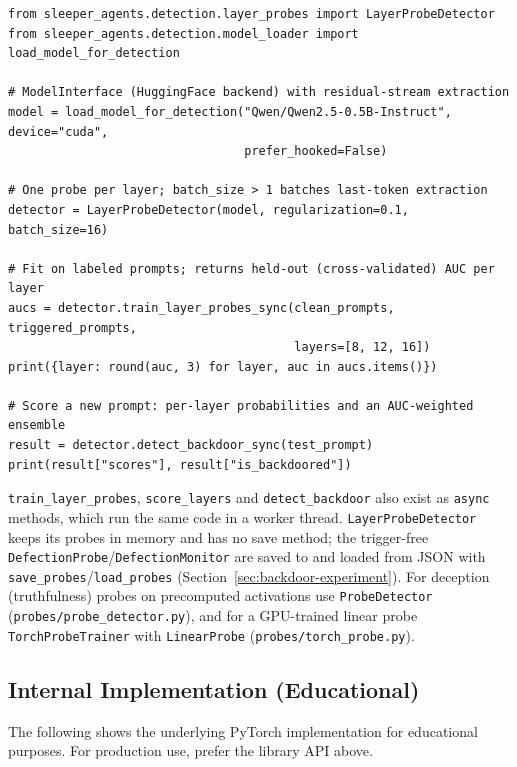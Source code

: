 \documentclass[11pt,letterpaper]{article}
\let\origsubsection\subsection
\renewcommand{\subsection}{\needspace{8\baselineskip}\origsubsection}}
\begin{document}
\begin{recipebox}
\begin{lstlisting}
from sleeper_agents.detection.layer_probes import LayerProbeDetector
from sleeper_agents.detection.model_loader import load_model_for_detection

# ModelInterface (HuggingFace backend) with residual-stream extraction
model = load_model_for_detection("Qwen/Qwen2.5-0.5B-Instruct", device="cuda",
                                 prefer_hooked=False)

# One probe per layer; batch_size > 1 batches last-token extraction
detector = LayerProbeDetector(model, regularization=0.1, batch_size=16)

# Fit on labeled prompts; returns held-out (cross-validated) AUC per layer
aucs = detector.train_layer_probes_sync(clean_prompts, triggered_prompts,
                                        layers=[8, 12, 16])
print({layer: round(auc, 3) for layer, auc in aucs.items()})

# Score a new prompt: per-layer probabilities and an AUC-weighted ensemble
result = detector.detect_backdoor_sync(test_prompt)
print(result["scores"], result["is_backdoored"])
\end{lstlisting}
\end{recipebox}

\texttt{train\_layer\_probes}, \texttt{score\_layers} and \texttt{detect\_backdoor} also exist as \texttt{async} methods, which run the same code in a worker thread. \texttt{LayerProbeDetector} keeps its probes in memory and has no save method; the trigger-free \texttt{DefectionProbe}/\texttt{DefectionMonitor} are saved to and loaded from JSON with \texttt{save\_probes}/\texttt{load\_probes} (Section~\ref{sec:backdoor-experiment}). For deception (truthfulness) probes on precomputed activations use \texttt{ProbeDetector} (\texttt{probes/probe\_detector.py}), and for a GPU-trained linear probe \texttt{TorchProbeTrainer} with \texttt{LinearProbe} (\texttt{probes/torch\_probe.py}).

\subsection{Internal Implementation (Educational)}

The following shows the underlying PyTorch implementation for educational purposes. For production use, prefer the library API above.
\end{document}
